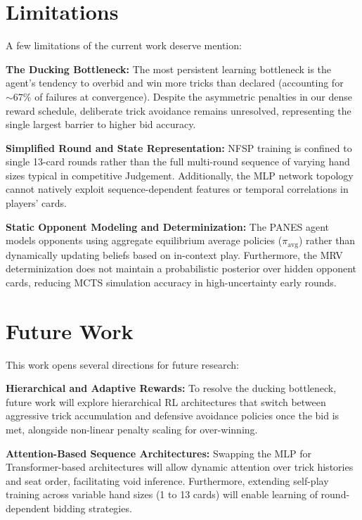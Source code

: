 \documentclass[conference]{IEEEtran}
\begin{document}
\section{\large \textbf{Limitations}}

A few limitations of the current work deserve mention:

\textbf{The Ducking Bottleneck:} The most persistent learning bottleneck is the agent's tendency to overbid and win more tricks than declared (accounting for $\sim\!67\%$ of failures at convergence). Despite the asymmetric penalties in our dense reward schedule, deliberate trick avoidance remains unresolved, representing the single largest barrier to higher bid accuracy.

\textbf{Simplified Round and State Representation:} NFSP training is confined to single 13-card rounds rather than the full multi-round sequence of varying hand sizes typical in competitive Judgement. Additionally, the MLP network topology cannot natively exploit sequence-dependent features or temporal correlations in players' cards.

\textbf{Static Opponent Modeling and Determinization:} The PANES agent models opponents using aggregate equilibrium average policies ($\pi_{\text{avg}}$) rather than dynamically updating beliefs based on in-context play. Furthermore, the MRV determinization does not maintain a probabilistic posterior over hidden opponent cards, reducing MCTS simulation accuracy in high-uncertainty early rounds.

\section{\large \textbf{Future Work}}

This work opens several directions for future research:

\textbf{Hierarchical and Adaptive Rewards:} To resolve the ducking bottleneck, future work will explore hierarchical RL architectures that switch between aggressive trick accumulation and defensive avoidance policies once the bid is met, alongside non-linear penalty scaling for over-winning.

\textbf{Attention-Based Sequence Architectures:} Swapping the MLP for Transformer-based architectures will allow dynamic attention over trick histories and seat order, facilitating void inference. Furthermore, extending self-play training across variable hand sizes (1 to 13 cards) will enable learning of round-dependent bidding strategies.
\end{document}
